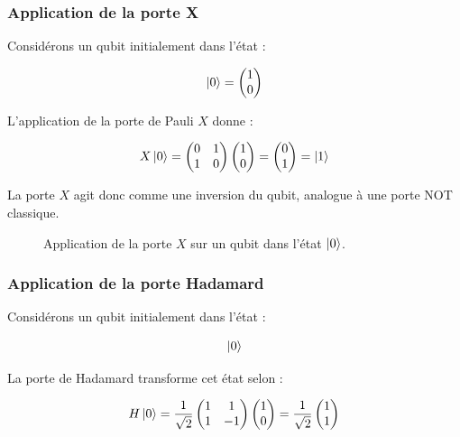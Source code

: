 \documentclass[a4paper,12pt]{article}
\begin{document}
\subsubsection{Application de la porte X}

Considérons un qubit initialement dans l’état :

\[
\ket{0}
=
\begin{pmatrix}
1\\
0
\end{pmatrix}
\]

L’application de la porte de Pauli $X$ donne :

\[
X\ket{0}
=
\begin{pmatrix}
0&1\\
1&0
\end{pmatrix}
\begin{pmatrix}
1\\
0
\end{pmatrix}
=
\begin{pmatrix}
0\\
1
\end{pmatrix}
=
\ket{1}
\]

La porte $X$ agit donc comme une inversion du qubit, analogue à une porte NOT classique.

\begin{figure}[H]
\centering
{}
\caption{Application de la porte $X$ sur un qubit dans l’état $\ket{0}$.}
\end{figure}

\subsubsection{Application de la porte Hadamard}

Considérons un qubit initialement dans l’état :

\[
\ket{0}
\]

La porte de Hadamard transforme cet état selon :

\[
H\ket{0}
=
\frac{1}{\sqrt{2}}
\begin{pmatrix}
1&1\\
1&-1
\end{pmatrix}
\begin{pmatrix}
1\\
0
\end{pmatrix}
=
\frac{1}{\sqrt{2}}
\begin{pmatrix}
1\\
1
\end{pmatrix}
\]
\end{document}
